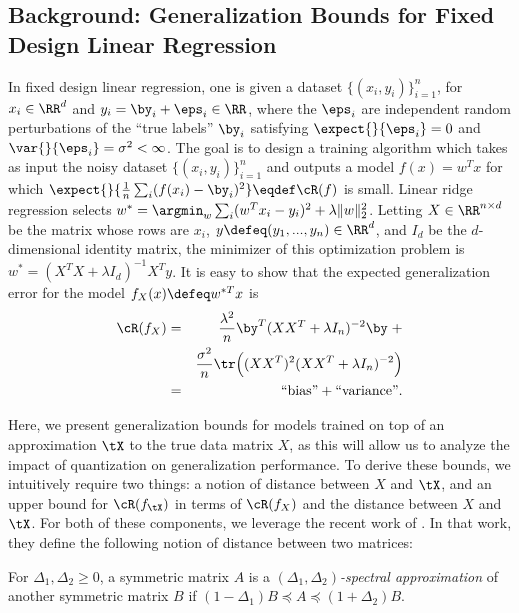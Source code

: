 \subsection{Background: Generalization Bounds for Fixed Design Linear Regression}
\label{sec:background}
In fixed design linear regression, one is given a dataset $\{(x_i,y_i)\}_{i=1}^n$, for $x_i \in \RR^d$ and $y_i = \by_i + \eps_i \in \RR$, where the $\eps_i$ are independent random perturbations of the ``true labels'' $\by_i$ satisfying $\expect{}{\eps_i} = 0$ and $\var{}{\eps_i} = \sigma^2 < \infty$.
The goal is to design a training algorithm which takes as input the noisy dataset $\{(x_i,y_i)\}_{i=1}^n$ and outputs a model $f(x) = w^T x$ for which $\expect{}{\frac{1}{n}\sum_i (f(x_i) -\by_i)^2} \eqdef \cR(f)$ is small.
Linear ridge regression selects $w^* = \argmin_w \sum_i (w^T x_i - y_i)^2 + \lambda\|w\|_2^2$.
Letting $X \in \RR^{n\times d}$ be the matrix whose rows are $x_i$, $y \defeq (y_1,...,y_n) \in \RR^d$, and $I_d$ be the $d$-dimensional identity matrix, the minimizer of this optimization problem is $w^* = ( X^T X + \lambda I_d)^{-1}X^Ty$.
It is easy to show \citep{alaoui15} that the expected generalization error for the model $f_X(x) \defeq w^{*T}x$ is
\begin{eqnarray*}
\cR(f_X) &=& \frac{\lambda^2}{n} \by^T(XX^T + \lambda I_n)^{-2}\by \; +\\ && \frac{\sigma^2}{n}\tr\Big((XX^T)^2(XX^T + \lambda I_n)^{-2}\Big)\\
&=& \text{``bias''} + \text{``variance''}.
\end{eqnarray*}

Here, we present generalization bounds for models trained on top of an approximation $\tX$ to the true data matrix $X$, as this will allow us to analyze the impact of quantization on generalization performance.
To derive these bounds, we intuitively require two things: a notion of distance between $X$ and $\tX$, and an upper bound for $\cR(f_{\tX})$ in terms of $\cR(f_X)$ and the distance between $X$ and $\tX$.
For both of these components, we leverage the recent work of \citep{lprff18}.
In that work, they define the following notion of distance between two matrices:

\begin{definition}{\citep{lprff18}}
	\label{def:specdist}
	For $\Delta_1, \Delta_2 \geq 0$, a symmetric matrix $A$ is a \emph{$(\Delta_1, \Delta_2)$-spectral approximation} of another symmetric matrix $B$ if $(1-\Delta_1)B \preceq A \preceq (1+\Delta_2)B$. 
\end{definition}

